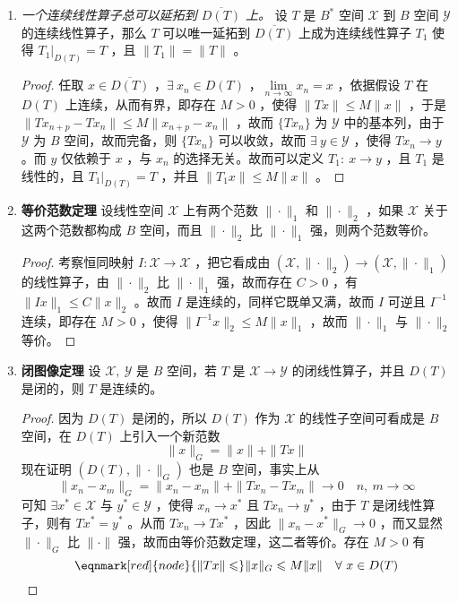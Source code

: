 \begin{enumerate}[leftmargin=2cm, label=\arabic*]
		\item \textit{一个连续线性算子总可以延拓到 $\overline{D(T)}$ 上。} 设 $T$ 是 $B^*$  空间 $\mathscr{X}$ 到 $B$ 空间 $\mathscr{Y}$ 的连续线性算子，那么 $T$ 可以唯一延拓到 $\overline{D(T)}$ 上成为连续线性算子 $T_1$ 使得 $T_1\bigg|_{D(T)} = T$ ，且 $\|T_1\| = \|T\|$ 。
		\begin{proof}
			任取 $x\in\overline{D(T)}$ ，$\exists\ x_n\in D(T)$ ，$\lim\limits_{n\to\infty} x_n = x$ ，依据假设 $T$ 在 $D(T)$ 上连续，从而有界，即存在 $M>0$ ，使得 $\|Tx\| \leqslant M \|x\|$ ，于是 $\|Tx_{n+p} - Tx_n\| \leqslant M\|x_{n+p} - x_n\|$ ，故而 $\{Tx_n\}$ 为 $\mathscr{Y}$ 中的基本列，由于 $\mathscr{Y}$ 为 $B$ 空间，故而完备，则 $\{Tx_n\}$ 可以收敛，故而 $\exists\ y\in \mathscr{Y}$ ，使得 $Tx_n\to y$ 。而 $y$ 仅依赖于 $x$ ，与 $x_n$ 的选择无关。故而可以定义 $T_1:\ x\to y$ ，且 $T_1$ 是线性的，且 $T_1\big|_{D(T)} = T$ ，并且 $\|T_1x\| \leqslant M\|x\|$ 。 
		\end{proof}
		\item \textbf{等价范数定理} 设线性空间 $\mathscr{X}$ 上有两个范数 $\|\cdot\|_1$ 和 $\|\cdot\|_2$ ，如果 $\mathscr{X}$ 关于这两个范数都构成 $B$ 空间，而且 $\|\cdot\|_2$ 比 $\|\cdot\|_1$ 强，则两个范数等价。
		\begin{proof}
			考察恒同映射 $I:\mathscr{X}\to\mathscr{X}$ ，把它看成由 $(\mathscr{X}, \|\cdot\|_2)\to(\mathscr{X},\|\cdot\|_1)$ 的线性算子，由 $\|\cdot\|_2$ 比 $\|\cdot\|_1$ 强，故而存在 $C>0$ ，有 $\|Ix\|_1\leqslant C\|x\|_2$ 。故而 $I$ 是连续的，同样它既单又满，故而 $I$ 可逆且 $I^{-1}$ 连续，即存在 $M>0$ ，使得 $\|I^{-1}x\|_2 \leqslant M\|x\|_1$ ，故而 $\|\cdot\|_1$ 与 $\|\cdot\|_2$ 等价。
		\end{proof}
		\item \textbf{闭图像定理} 设 $\mathscr{X},\ \mathscr{Y}$ 是 $B$ 空间，若 $T$ 是 $\mathscr{X}\to\mathscr{Y}$ 的闭线性算子，并且 $D(T)$ 是闭的，则 $T$ 是连续的。
		\begin{proof}
			因为 $D(T)$ 是闭的，所以 $D(T)$ 作为 $\mathscr{X}$ 的线性子空间可看成是 $B$ 空间，在 $D(T)$ 上引入一个新范数
			\begin{equation*}
				\|x\|_G = \|x\| + \|Tx\|
			\end{equation*}
			现在证明 $(D(T),\|\cdot\|_G)$ 也是 $B$ 空间，事实上从 
			\begin{equation*}
				\|x_n - x_m\|_G = \|x_n - x_m\| + \|Tx_n - Tx_m\| \to 0 \quad n,\ m\to \infty
			\end{equation*}
			可知 $\exists x^*\in\mathscr{X}$ 与 $y^*\in\mathscr{Y}$ ，使得 $x_n\to x^*$ 且 $Tx_n\to y^*$ ，由于 $T$ 是闭线性算子，则有 $Tx^* = y^*$ 。从而 $Tx_n \to Tx^*$ ，因此 $\|x_n - x^*\|_G \to 0$ ，而又显然 $\|\cdot\|_G$ 比 $\|\cdot\|$ 强，故而由等价范数定理，这二者等价。存在 $M>0$ 有
			\begin{equation*}
				\eqnmark[red]{node}{\|Tx\| \leqslant} \|x\|_G \leqslant M\|x\| \quad \forall\ x\in D(T)
			\end{equation*}
			

\end{proof}
\end{enumerate}
